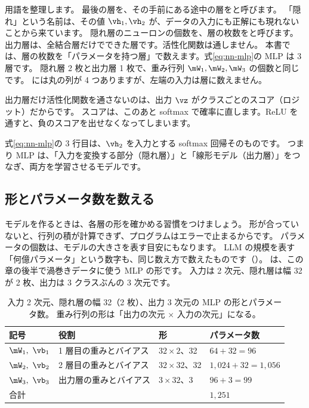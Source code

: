 用語を整理します。
最後の層を、その手前にある途中の層をと呼びます。
「隠れ」という名前は、その値 $\vh_1,\vh_2$ が、データの入力にも正解にも現れないことから来ています。
隠れ層のニューロンの個数を、層の枚数をと呼びます。
出力層は、全結合層だけでできた層です。活性化関数は通しません。
本書では、層の枚数を「パラメータを持つ層」で数えます。式\eqref{eq:nn-mlp}の MLP は 3 層です。
隠れ層 2 枚と出力層 1 枚で、重み行列 $\mW_1,\mW_2,\mW_3$ の個数と同じです。
には丸の列が 4 つありますが、左端の入力は層に数えません。

出力層だけ活性化関数を通さないのは、出力 $\vz$ がクラスごとのスコア（ロジット）だからです。
スコアは、このあと softmax で確率に直します。ReLU を通すと、負のスコアを出せなくなってしまいます。

式\eqref{eq:nn-mlp}の 3 行目は、$\vh_2$ を入力とする softmax 回帰そのものです。
つまり MLP は、「入力を変換する部分（隠れ層）」と「線形モデル（出力層）」をつなぎ、両方を学習させるモデルです。

\subsection*{形とパラメータ数を数える}

モデルを作るときは、各層の形を確かめる習慣をつけましょう。
形が合っていないと、行列の積が計算できず、プログラムはエラーで止まるからです。
パラメータの個数は、モデルの大きさを表す目安にもなります。
LLM の規模を表す「何億パラメータ」という数字も、同じ数え方で数えたものです（）。
は、この章の後半で渦巻きデータに使う MLP の形です。
入力は 2 次元、隠れ層は幅 32 が 2 枚、出力は 3 クラスぶんの 3 次元です。

\begin{table}[tbp]
\centering
\caption{入力 2 次元、隠れ層の幅 32（2 枚）、出力 3 次元の MLP の形とパラメータ数。
重み行列の形は「出力の次元 $\times$ 入力の次元」になる。}
\label{tab:nn-shapes}
\small
\begin{tabular}{llll}
\toprule
記号 & 役割 & 形 & パラメータ数 \\
\midrule
$\mW_1,\ \vb_1$ & 1 層目の重みとバイアス & $32\times 2$、32 & $64+32=96$ \\
$\mW_2,\ \vb_2$ & 2 層目の重みとバイアス & $32\times 32$、32 & $1{,}024+32=1{,}056$ \\
$\mW_3,\ \vb_3$ & 出力層の重みとバイアス & $3\times 32$、3 & $96+3=99$ \\
\midrule
合計 & & & $1{,}251$ \\
\bottomrule
\end{tabular}
\end{table}

